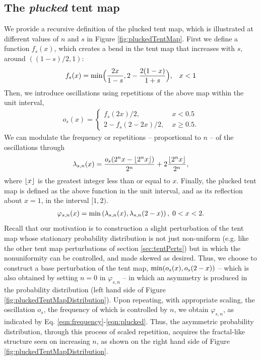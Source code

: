 \subsection{The \emph{plucked} tent map}
\label{sec:pluckedTentMap}
We provide a recursive definition of the plucked tent map, which 
is illustrated at different values of $n$ and $s$ in Figure \ref{fig:pluckedTentMap}. First we define a function $f_s(x)$, which 
creates a bend in the tent map that increases with $s$, around 
$((1-s)/2,1)$:
\begin{align}
		f_s(x) = 		{\rm min}\Big(
				\dfrac{2x}{1-s}, 2 - \dfrac{2(1-x)}{1+s}\Big),
				\;\;\; x < 1 \\
\end{align}
Then, we introduce oscillations using repetitions of
the above map within the unit interval,
\begin{align}
		o_s(x) = \begin{cases}
				f_s(2x)/2, & \; x < 0.5 \\
				2 - f_s(2-2x)/2, & \; x \ge 0.5.
		\end{cases}
\end{align}
We can modulate
the frequency or repetitions -- proportional to $n$ -- 
of the oscillations through
\begin{align}
		\label{eqn:frequency}
		\lambda_{s,n}(x) = \dfrac{o_s(2^n x - \floor*{2^n x})}{2^n} 
		+ 2 \frac{\floor*{2^n x}}{2^n},
\end{align}
where $\floor*{x}$ is the greatest integer less than or equal to $x$.
Finally, the plucked tent map is defined as the above function 
in the unit interval, and as its reflection about $x=1$,
in the interval $[1,2)$.
\begin{align}
		\label{eqn:plucked}
		\varphi_{s,n}(x) = {\rm min}\left(
		\lambda_{s,n}(x), \lambda_{s,n}(2-x)\right), \; 0< x < 2. 
\end{align}
Recall that our motivation is to construction a slight perturbation of the tent map whose stationary probability distribution is not just 
non-uniform (e.g. like the other tent map perturbations of section \ref{sec:tentPerts}) but in which the nonuniformity can be controlled, and made skewed as desired. Thus, we choose to construct a base perturbation of the tent map, ${\rm min}(o_s(x), o_s(2-x))$ -- 
which is also obtained by setting $n=0$ in $\varphi_{s,n}$ --  
in which an asymmetry is produced in the probability distribution (left hand side of Figure \ref{fig:pluckedTentMapDistribution}).
Upon repeating, with appropriate scaling, the oscillation $o_s$, 
the frequency of which is controlled by $n$, we obtain $\varphi_{s,n}$, 
as indicated by Eq. \ref{eqn:frequency}-\ref{eqn:plucked}. Thus, the asymmetric probability distribution, through this process of scaled repetition, acquires the fractal-like structure seen on increasing $n$, as shown on the right hand side of Figure \ref{fig:pluckedTentMapDistribution}.

